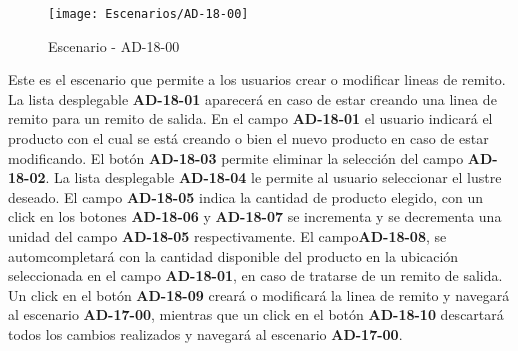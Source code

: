 \begin{figure}[H]
\centering
\texttt{[image: Escenarios/AD-18-00]}
\caption{Escenario - AD-18-00}
\label{fig:AD-18-00}
\end{figure}
Este es el escenario que permite a los usuarios crear o modificar lineas de remito. La lista desplegable \textbf{AD-18-01} aparecerá en caso de estar creando una linea de remito para un remito de salida. En el campo \textbf{AD-18-01} el usuario indicará el producto con el cual se está creando o bien el nuevo producto en caso de estar modificando. El botón \textbf{AD-18-03} permite eliminar la selección del campo \textbf{AD-18-02}. La lista desplegable \textbf{AD-18-04} le permite al usuario seleccionar el lustre deseado. El campo \textbf{AD-18-05} indica la cantidad de producto elegido, con un click en los botones \textbf{AD-18-06} y \textbf{AD-18-07} se incrementa y se decrementa una unidad del campo \textbf{AD-18-05} respectivamente. El campo\textbf{AD-18-08}, se automcompletará con la cantidad disponible del producto en la ubicación seleccionada en el campo \textbf{AD-18-01}, en caso de tratarse de un remito de salida. 
Un click en el botón \textbf{AD-18-09} creará o modificará la linea de remito y navegará al escenario \textbf{AD-17-00}, mientras que un click en el botón \textbf{AD-18-10} descartará todos los cambios realizados y navegará al escenario \textbf{AD-17-00}.
\clearpage
